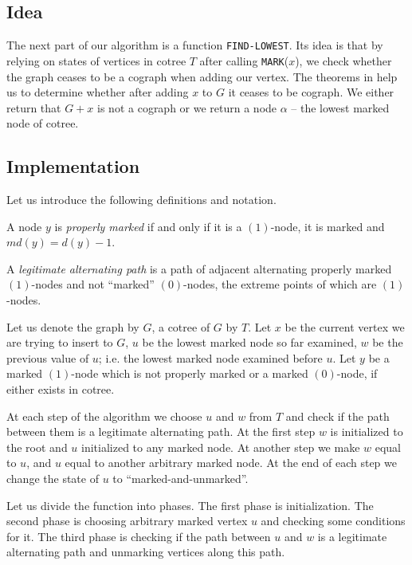 \subsection{Idea}
The next part of our algorithm is a function \texttt{FIND-LOWEST}. Its idea is that by relying on states of vertices in cotree $T$ after calling \texttt{MARK}($x$), we check whether the graph ceases to be a cograph when adding our vertex. The theorems in  help us to determine whether after adding $x$ to $G$ it ceases to be cograph. We either return that $G+x$ is not a cograph or we return a node $\alpha$ -- the lowest marked node of cotree. 



\subsection{Implementation}
Let us introduce the following definitions and notation.
\begin{definition}
    A node $y$ is \emph{properly marked} if and only if it is a $(1)$-node, it is marked and $md(y) = d(y) - 1$. 
\end{definition}

\begin{definition}
    A \emph{legitimate alternating path} is a path of adjacent alternating properly marked $(1)$-nodes and not ``marked'' $(0)$-nodes, the extreme points of which are $(1)$-nodes.
\end{definition}
 Let us denote the graph by $G$, a cotree of $G$ by $T$. Let $x$ be the current vertex we are trying to insert to $G$, $u$ be the lowest marked node so far examined, $w$ be the previous value of $u$; i.e. the lowest marked node examined before $u$. Let $y$ be a marked $(1)$-node which is not properly marked or a marked $(0)$-node, if either exists in cotree.

At each step of the algorithm we choose $u$ and $w$ from $T$ and check if the path between them is a legitimate alternating path. At the first step $w$ is initialized to the root and $u$ initialized to any marked node. At another step we make $w$ equal to $u$, and $u$ equal to another arbitrary marked node. At the end of each step we change the state of $u$ to ``marked-and-unmarked''.

Let us divide the function into phases. The first phase is initialization. The second phase is choosing arbitrary marked vertex $u$ and checking some conditions for it. The third phase is checking if the path between $u$ and $w$ is a legitimate alternating path and unmarking vertices along this path. 

